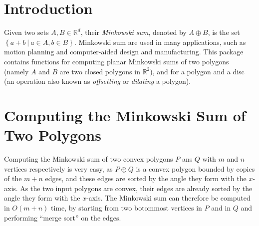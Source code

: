 \lcTex{%
  \newlength{\widthExtra}\setlength{\widthExtra}{1.1cm}
  \newlength{\widthLineReal}\setlength{\widthLineReal}{\linewidth}
  \addtolength{\widthLineReal}{-\widthExtra}
  \newlength{\minipageSpace}\setlength{\minipageSpace}{0.2cm}

  \newlength{\widthLeft}
  \newlength{\widthRight}
}

\newcommand{\reals}{\mathbb{R}}
\newcommand{\calC}{{\cal C}}
\newcommand{\calA}{{\cal A}}
\newcommand{\eps}{{\varepsilon}}
\newcommand{\dcel}{{\sc Dcel}}
\newcommand{\naive}{na\"{\i}ve}
\newcommand{\kdtree}{{\sc Kd}-tree}
\newcommand{\Cpp}{{C}{\tt ++}}

\section{Introduction}
\label{mink_sec:intro}

Given two sets $A,B \in \reals^d$, their \emph{Minkowski sum},
denoted by $A \oplus B$, is the set $\left\{ a + b ~\vert~ a \in
A, b \in B \right\}$. Minkowski sum are used in many applications,
such as motion planning and computer-aided design and
manufacturing. This package contains functions for computing planar
Minkowski sums of two polygons (namely $A$ and $B$ are two closed
polygons in $\reals^2$), and for a polygon and a disc (an operation
also known as \emph{offsetting} or \emph{dilating} a polygon).

\section{Computing the Minkowski Sum of Two Polygons}
\label{mink_sec:sum_poly}

Computing the Minkowski sum of two convex polygons $P$ ans $Q$ with
$m$ and $n$ vertices respectively is very easy, as $P \oplus Q$ is a
convex polygon bounded by copies of the $m + n$ edges, and these edges
are sorted by the angle they form with the $x$-axis. As the two
input polygons are convex, their edges are already sorted by the
angle they form with the $x$-axis. The Minkowski sum can therefore be
computed in $O(m + n)$ time, by starting from two botommost vertices
in $P$ and in $Q$ and performing ``merge sort'' on the edges.

